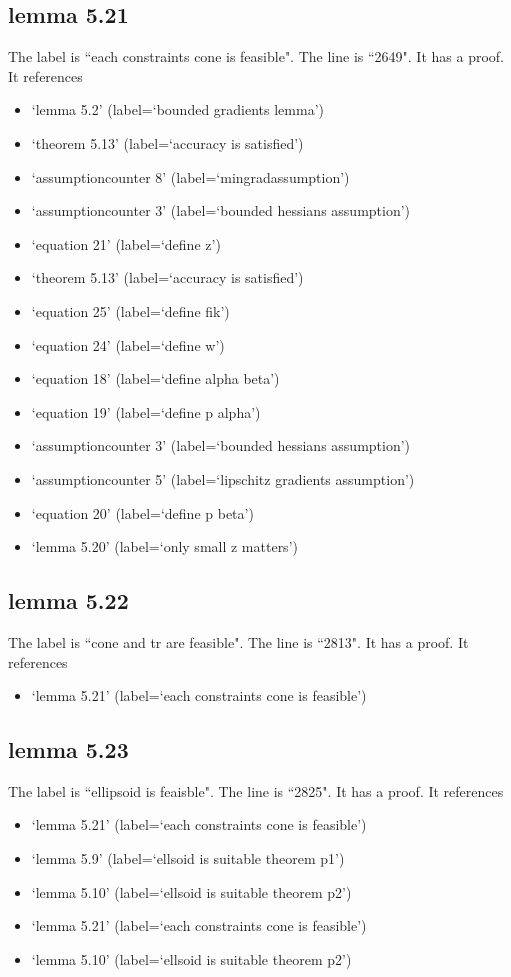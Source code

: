 \documentclass{article}
\begin{document}
\subsection{lemma 5.21}
The label is ``each constraints cone is feasible".
The line is ``2649".
It has a proof.
It references \begin{itemize}
\item `lemma 5.2' (label=`bounded gradients lemma')
\item `theorem 5.13' (label=`accuracy is satisfied')
\item `assumptioncounter 8' (label=`mingradassumption')
\item `assumptioncounter 3' (label=`bounded hessians assumption')
\item `equation 21' (label=`define z')
\item `theorem 5.13' (label=`accuracy is satisfied')
\item `equation 25' (label=`define fik')
\item `equation 24' (label=`define w')
\item `equation 18' (label=`define alpha beta')
\item `equation 19' (label=`define p alpha')
\item `assumptioncounter 3' (label=`bounded hessians assumption')
\item `assumptioncounter 5' (label=`lipschitz gradients assumption')
\item `equation 20' (label=`define p beta')
\item `lemma 5.20' (label=`only small z matters')
\end{itemize}
\subsection{lemma 5.22}
The label is ``cone and tr are feasible".
The line is ``2813".
It has a proof.
It references \begin{itemize}
\item `lemma 5.21' (label=`each constraints cone is feasible')
\end{itemize}
\subsection{lemma 5.23}
The label is ``ellipsoid is feaisble".
The line is ``2825".
It has a proof.
It references \begin{itemize}
\item `lemma 5.21' (label=`each constraints cone is feasible')
\item `lemma 5.9' (label=`ellsoid is suitable theorem p1')
\item `lemma 5.10' (label=`ellsoid is suitable theorem p2')
\item `lemma 5.21' (label=`each constraints cone is feasible')
\item `lemma 5.10' (label=`ellsoid is suitable theorem p2')
\end{itemize}
\end{document}
